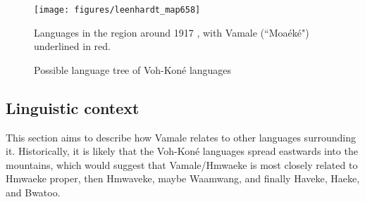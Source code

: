 \begin{figure}
	\texttt{[image: figures/leenhardt\_map658]}
	\caption{Languages in the region around 1917 \parencite[658]{leenhardt_langues_1946}, with Vamale (``Moaéké") underlined in red.}
	\label{map:languages_1917}
\end{figure}
 
 \begin{figure}
 	\caption{Possible language tree of Voh-Koné languages}
 	\label{fig:VKTree}
 \end{figure}
 
 \subsection{Linguistic context}
 This section aims to describe how Vamale relates to other languages surrounding it.
 Historically, it is likely that the Voh-Koné languages spread eastwards into the mountains, which would suggest that Vamale/Hmwaeke is most closely related to Hmwaeke proper, then Hmwaveke, maybe Waamwang, and finally Haveke, Haeke, and Bwatoo.
 
